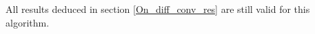 \begin{remark}
	All results deduced in section \ref{On_diff_conv_res} are still valid for this algorithm.
\end{remark}









%
%
%
%
%
%
%
%
%
%
